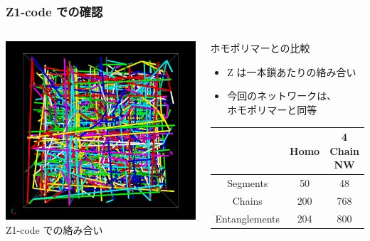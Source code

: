 \documentclass[12pt, dvipdfmx]{beamer}
\begin{document}
\begin{frame}
    \frametitle{Z1-code での確認}
        \vspace{-3mm}
        \begin{columns}[T, onlytextwidth]
                \includegraphics[width=\textwidth]{z_cord_4Chain.png}
                Z1-code での絡み合い
            \begin{block}{ホモポリマーとの比較}
                \begin{itemize}
                    \item Z は一本鎖あたりの絡み合い
                    \item 今回のネットワークは、\\ \alert{ホモポリマーと同等}
                \end{itemize}
                \scriptsize
                \begin{center}
                    \begin{tabular}{c||c|c} \hline
                        &Homo & 4 Chain NW \\ \hline \hline
                        Segments& 50& 48 \\ \hline
                        Chains & 200& 768 \\ \hline
                        Entanglements& 204& 800\\ \hline

\end{tabular}
\end{center}
\end{block}
\end{columns}
\end{frame}
\end{document}
